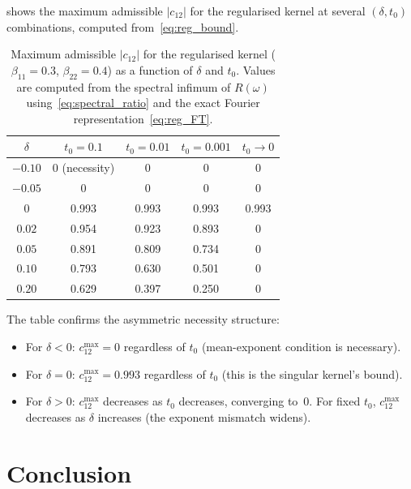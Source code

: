 \documentclass[12pt]{article}
\theoremstyle{definition}
\theoremstyle{remark}
\begin{document}
 shows the maximum admissible $|c_{12}|$ for the regularised
kernel at several $(\delta, t_0)$ combinations, computed from~\eqref{eq:reg_bound}.

\begin{table}[ht]
\centering
\caption{Maximum admissible $|c_{12}|$ for the regularised kernel
($\beta_{11}=0.3$, $\beta_{22}=0.4$) as a function of $\delta$ and $t_0$.
Values are computed from the spectral infimum of $R(\omega)$
using~\eqref{eq:spectral_ratio} and the exact Fourier
representation~\eqref{eq:reg_FT}.}
\label{tab:reg_t0}
\begin{tabular}{c|cccc}
\toprule
$\delta$ & $t_0=0.1$ & $t_0=0.01$ & $t_0=0.001$ & $t_0\to 0$ \\
\midrule
$-0.10$ & 0 (necessity) & 0 & 0 & 0 \\
$-0.05$ & 0 & 0 & 0 & 0 \\
$0$ & 0.993 & 0.993 & 0.993 & 0.993 \\
$0.02$ & 0.954 & 0.923 & 0.893 & 0 \\
$0.05$ & 0.891 & 0.809 & 0.734 & 0 \\
$0.10$ & 0.793 & 0.630 & 0.501 & 0 \\
$0.20$ & 0.629 & 0.397 & 0.250 & 0 \\
\bottomrule
\end{tabular}
\end{table}

The table confirms the asymmetric necessity structure:
\begin{itemize}[nosep]
\item For $\delta < 0$: $c_{12}^{\max}=0$ regardless of $t_0$
  (mean-exponent condition is necessary).
\item For $\delta = 0$: $c_{12}^{\max}=0.993$ regardless of $t_0$
  (this is the singular kernel's bound).
\item For $\delta > 0$: $c_{12}^{\max}$ decreases as $t_0$ decreases,
  converging to~0.  For fixed $t_0$, $c_{12}^{\max}$ decreases as
  $\delta$ increases (the exponent mismatch widens).
\end{itemize}


\section{Conclusion}\label{sec:conclusion}
\end{document}
